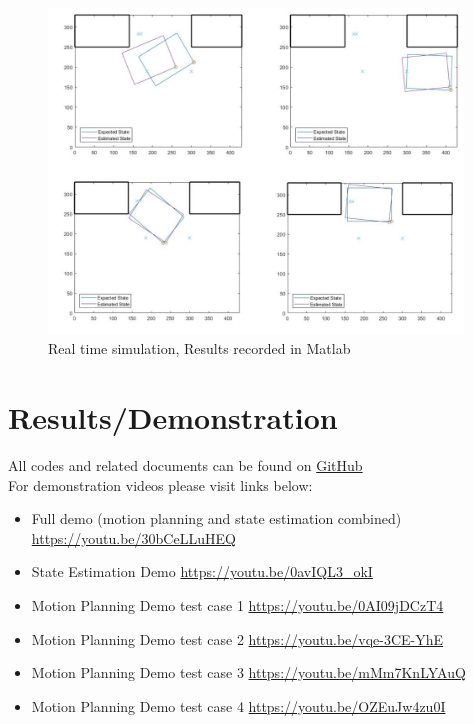 \documentclass[12pt, letterpaper]{amsart} %
\numberwithin{equation}{section}
\begin{document}
\begin{figure}[h!]
\includegraphics[width=110mm]{./img/fig_19.png}
\caption{Real time simulation, Results recorded in Matlab}
\label{fig:figure19}	
\end{figure}
\newpage

\section{Results/Demonstration}
All codes and related documents can be found on \href{https://github.com/ckwojai/2wheelcar}{GitHub}
\\For demonstration videos please visit links below:
\begin{itemize}
\item Full demo (motion planning and state estimation combined) \\
\url{https://youtu.be/30bCeLLuHEQ}
\item State Estimation Demo 
\url{https://youtu.be/0avIQL3_okI}
\item Motion Planning Demo test case 1
\url{https://youtu.be/0AI09jDCzT4}
\item Motion Planning Demo test case 2 
\url{https://youtu.be/vqe-3CE-YhE}
\item Motion Planning Demo test case 3 
\url{https://youtu.be/mMm7KnLYAuQ}
\item Motion Planning Demo test case 4 
\url{https://youtu.be/OZEuJw4zu0I}
\end{itemize}


 
\end{document}
